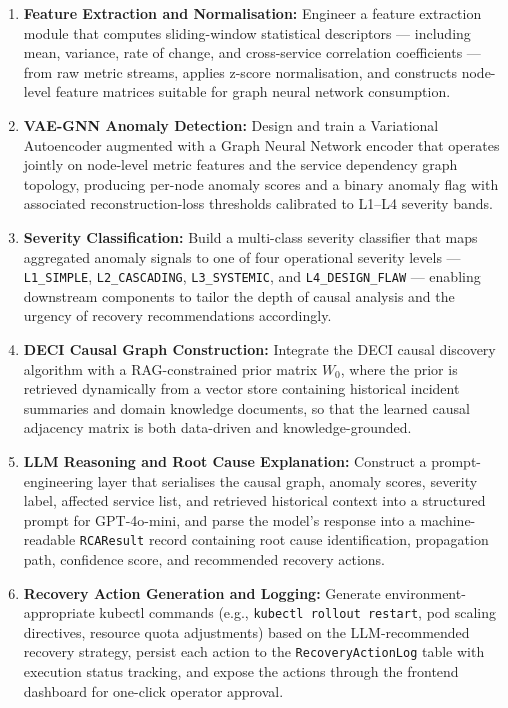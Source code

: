 \begin{itemize}
\begin{enumerate}
        \item \textbf{Feature Extraction and Normalisation:} Engineer a feature extraction module that computes sliding-window statistical descriptors — including mean, variance, rate of change, and cross-service correlation coefficients — from raw metric streams, applies z-score normalisation, and constructs node-level feature matrices suitable for graph neural network consumption.

        \item \textbf{VAE-GNN Anomaly Detection:} Design and train a Variational Autoencoder augmented with a Graph Neural Network encoder that operates jointly on node-level metric features and the service dependency graph topology, producing per-node anomaly scores and a binary anomaly flag with associated reconstruction-loss thresholds calibrated to L1–L4 severity bands.

        \item \textbf{Severity Classification:} Build a multi-class severity classifier that maps aggregated anomaly signals to one of four operational severity levels — \texttt{L1\_SIMPLE}, \texttt{L2\_CASCADING}, \texttt{L3\_SYSTEMIC}, and \texttt{L4\_DESIGN\_FLAW} — enabling downstream components to tailor the depth of causal analysis and the urgency of recovery recommendations accordingly.

        \item \textbf{DECI Causal Graph Construction:} Integrate the DECI causal discovery algorithm with a RAG-constrained prior matrix $W_0$, where the prior is retrieved dynamically from a vector store containing historical incident summaries and domain knowledge documents, so that the learned causal adjacency matrix is both data-driven and knowledge-grounded.

        \item \textbf{LLM Reasoning and Root Cause Explanation:} Construct a prompt-engineering layer that serialises the causal graph, anomaly scores, severity label, affected service list, and retrieved historical context into a structured prompt for GPT-4o-mini, and parse the model's response into a machine-readable \texttt{RCAResult} record containing root cause identification, propagation path, confidence score, and recommended recovery actions.

        \item \textbf{Recovery Action Generation and Logging:} Generate environment-appropriate kubectl commands (e.g., \texttt{kubectl rollout restart}, pod scaling directives, resource quota adjustments) based on the LLM-recommended recovery strategy, persist each action to the \texttt{RecoveryActionLog} table with execution status tracking, and expose the actions through the frontend dashboard for one-click operator approval.
    \end{enumerate}

\end{itemize}

